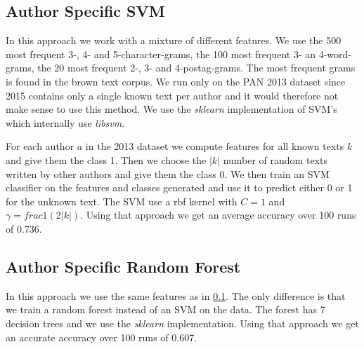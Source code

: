 \subsection{Author Specific SVM} \label{subsec:author_specific_svm}
In this approach we work with a mixture of different features. We use the 500
most frequent 3-, 4- and 5-character-grams, the 100 most frequent 3- an
4-word-grams, the 20 most frequent 2-, 3- and 4-postag-grams. The most frequent
grams is found in the brown text corpus. We run only on the PAN 2013 dataset
since 2015 contains only a single known text per author and it would therefore
not make sense to use this method. We use the \textit{sklearn} implementation of
\gls{SVM}'s which internally use \textit{libsvm}.

For each author $a$ in the 2013 dataset we compute features for all known texts
$k$ and give them the class 1. Then we choose the $|k|$ number of random texts
written by other authors and give them the class 0. We then train an \gls{SVM}
classifier on the features and classes generated and use it to predict either 0
or 1 for the unknown text. The \gls{SVM} use a rbf kernel with $C=1$ and
$\gamma = frac{1}{(2|k|)}$. Using that approach we get an average accuracy over
100 runs of 0.736.

\subsection{Author Specific Random Forest}
In this approach we use the same features as in
\ref{subsec:author_specific_svm}. The only difference is that we train a random
forest instead of an \gls{SVM} on the data. The forest has 7 decision trees and
we use the \textit{sklearn} implementation. Using that approach we get an
accurate accuracy over 100 runs of 0.607.
